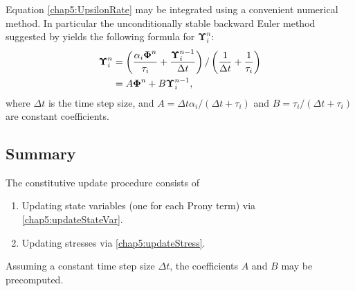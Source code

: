 \bigskip

\noindent Equation \eqref{chap5:UpsilonRate} may be integrated using a convenient numerical method. In particular the unconditionally stable backward Euler method suggested by \cite{Poon98} yields the following formula for $ \boldsymbol \Upsilon_i^n $:
\begin{align}
\boldsymbol \Upsilon_i^n &= \left( \dfrac{\alpha_i \boldsymbol \Phi^n}{\tau_i} + \dfrac{\boldsymbol \Upsilon_i^{n-1}}{\Delta t} \right) / \left(\dfrac{1}{\Delta t} + \dfrac{1}{\tau_i} \right) \notag \\
&= A \boldsymbol \Phi^n + B \boldsymbol \Upsilon_i^{n-1}, \label{chap5:updateStateVar}
\end{align}
where $ \Delta t $ is the time step size, and $ A = \Delta t \alpha_i / (\Delta t + \tau_i) $ and $ B = \tau_i / (\Delta t + \tau_i) $ are constant coefficients. 
	
	\subsection{Summary}	
The constitutive update procedure consists of
\begin{enumerate}
\item Updating state variables (one for each Prony term) via \eqref{chap5:updateStateVar}.
\item Updating stresses via \eqref{chap5:updateStress}.
\end{enumerate}
Assuming a constant time step size $ \Delta t $, the coefficients $ A $ and $ B $ may be precomputed. 